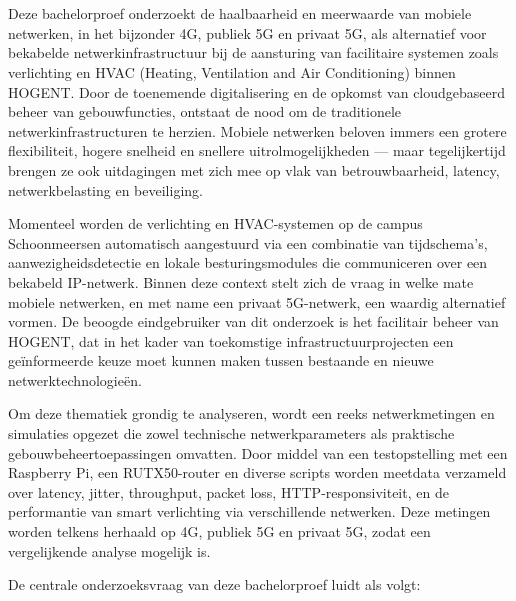 
\chapter{}%
\label{ch:inleiding}

Deze bachelorproef onderzoekt de haalbaarheid en meerwaarde van mobiele netwerken, in het bijzonder 4G, publiek 5G en privaat 5G, als alternatief voor bekabelde netwerkinfrastructuur bij de aansturing van facilitaire systemen zoals verlichting en HVAC (Heating, Ventilation and Air Conditioning) binnen HOGENT. Door de toenemende digitalisering en de opkomst van cloudgebaseerd beheer van gebouwfuncties, ontstaat de nood om de traditionele netwerkinfrastructuren te herzien. Mobiele netwerken beloven immers een grotere flexibiliteit, hogere snelheid en snellere uitrolmogelijkheden — maar tegelijkertijd brengen ze ook uitdagingen met zich mee op vlak van betrouwbaarheid, latency, netwerkbelasting en beveiliging.

Momenteel worden de verlichting en HVAC-systemen op de campus Schoonmeersen automatisch aangestuurd via een combinatie van tijdschema’s, aanwezigheidsdetectie en lokale besturingsmodules die communiceren over een bekabeld IP-netwerk. Binnen deze context stelt zich de vraag in welke mate mobiele netwerken, en met name een privaat 5G-netwerk, een waardig alternatief vormen. De beoogde eindgebruiker van dit onderzoek is het facilitair beheer van HOGENT, dat in het kader van toekomstige infrastructuurprojecten een geïnformeerde keuze moet kunnen maken tussen bestaande en nieuwe netwerktechnologieën.

Om deze thematiek grondig te analyseren, wordt een reeks netwerkmetingen en simulaties opgezet die zowel technische netwerkparameters als praktische gebouwbeheertoepassingen omvatten. Door middel van een testopstelling met een Raspberry Pi, een RUTX50-router en diverse scripts worden meetdata verzameld over latency, jitter, throughput, packet loss, HTTP-responsiviteit, en de performantie van smart verlichting via verschillende netwerken. Deze metingen worden telkens herhaald op 4G, publiek 5G en privaat 5G, zodat een vergelijkende analyse mogelijk is.

De centrale onderzoeksvraag van deze bachelorproef luidt als volgt:

